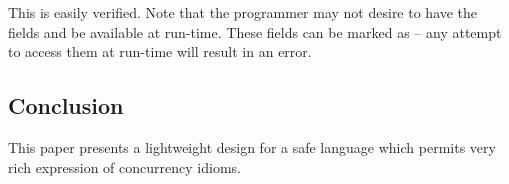 This is easily verified. 
Note that the programmer may not desire to have the fields 
and  be available at run-time. These fields can be marked
as  -- any attempt to access them at run-time will result
in an error.

\subsection{Conclusion}

This paper presents a lightweight design for a safe language which
permits very rich expression of concurrency idioms.
